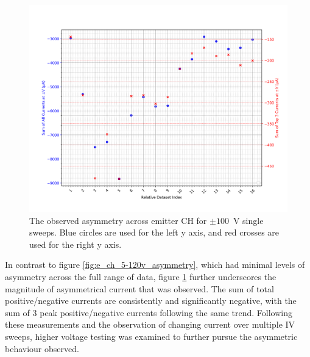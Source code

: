 \begin{refsection}
\begin{figure}[H]
    \centering
    \includegraphics[width=\linewidth]{Chapter7/Figs/Raster/Emitters/124-145_asymmetry.png}
    \caption{The observed asymmetry across emitter CH for $\pm100$~\si{\volt} single sweeps. Blue circles are used for the left y axis, and red crosses are used for the right y axis.}
    \label{fig:e_ch_124-145_asymmetry}
\end{figure}

In contrast to figure \ref{fig:e_ch_5-120v_asymmetry}, which had minimal levels of asymmetry across the full range of data, figure \ref{fig:e_ch_124-145_asymmetry} further underscores the magnitude of asymmetrical current that was observed. The sum of total positive/negative currents are consistently and significantly negative, with the sum of 3 peak positive/negative currents following the same trend. Following these measurements and the observation of changing current over multiple IV sweeps, higher voltage testing was examined to further pursue the asymmetric behaviour observed.


\end{refsection}
